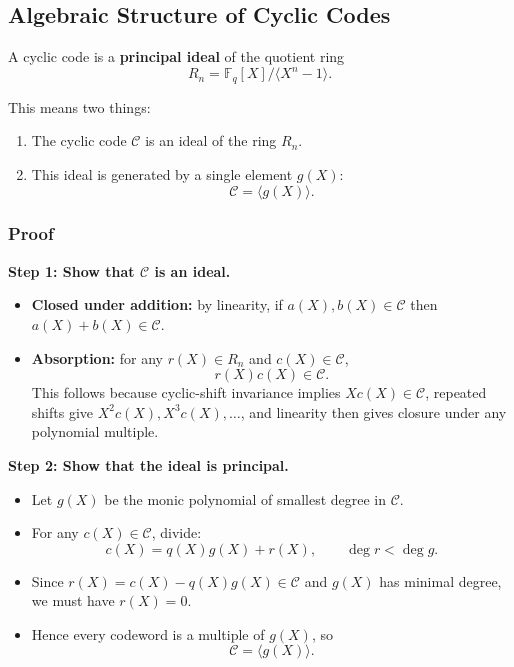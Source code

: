 \documentclass[
]{article}
\providecommand{\tightlist}{%
  \setlength{\itemsep}{0pt}\setlength{\parskip}{0pt}}
\begin{document}
\subsection{Algebraic Structure of Cyclic Codes}\label{what-is-the-algebraic-structure-of-a-cyclic-code}

A cyclic code is a \textbf{principal ideal} of the quotient ring
\[R_n = \mathbb{F}_q[X]/\langle X^n-1 \rangle.\]

This means two things:

\begin{enumerate}
\def\labelenumi{\arabic{enumi}.}
\tightlist
\item
  The cyclic code \(\mathcal{C}\) is an ideal of the ring \(R_n\).
\item
  This ideal is generated by a single element \(g(X)\):
  \[\mathcal{C}=\langle g(X) \rangle.\]
\end{enumerate}

\subsubsection{Proof}\label{proof-sketch}

\textbf{Step 1: Show that \(\mathcal{C}\) is an ideal.}

\begin{itemize}
\tightlist
\item
  \textbf{Closed under addition:} by linearity, if
  \(a(X),b(X)\in\mathcal{C}\) then \(a(X)+b(X)\in\mathcal{C}\).
\item
  \textbf{Absorption:} for any \(r(X)\in R_n\) and
  \(c(X)\in\mathcal{C}\), \[r(X)c(X)\in \mathcal{C}.\] This follows
  because cyclic-shift invariance implies \(Xc(X)\in\mathcal{C}\),
  repeated shifts give \(X^2c(X),X^3c(X),\dots\), and linearity then
  gives closure under any polynomial multiple.
\end{itemize}

\textbf{Step 2: Show that the ideal is principal.}

\begin{itemize}
\tightlist
\item
  Let \(g(X)\) be the monic polynomial of smallest degree in
  \(\mathcal{C}\).
\item
  For any \(c(X)\in\mathcal{C}\), divide:
  \[c(X)=q(X)g(X)+r(X), \qquad \deg r < \deg g.\]
\item
  Since \(r(X)=c(X)-q(X)g(X)\in\mathcal{C}\) and \(g(X)\) has minimal
  degree, we must have \(r(X)=0\).
\item
  Hence every codeword is a multiple of \(g(X)\), so
  \[\mathcal{C}=\langle g(X) \rangle.\]
\end{itemize}
\end{document}
